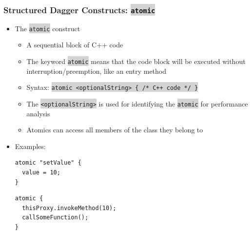 \documentclass{beamer}
\newcommand{\code}[1]{\colorbox{lightgray}{\texttt{#1}}}
\begin{document}
\begin{frame}[fragile]
  \frametitle{Structured Dagger Constructs: \code{atomic}}
  \begin{itemize}
    \item The \code{atomic} construct
      \begin{itemize}
        \item A sequential block of C++ code
        \item The keyword \code{atomic} means that the code block will be
          executed without interruption/preemption, like an entry method
        \item Syntax: \code{atomic <optionalString> \{ /* C++ code */ \}}
        \item The \code{<optionalString>} is used for identifying the
          \code{atomic} for performance analysis
        \item Atomics can access all members of the class they belong to
      \end{itemize}
    \item Examples:
      \begin{lstlisting}
atomic "setValue" {
  value = 10;
}
      \end{lstlisting}
      \begin{lstlisting}
atomic {
  thisProxy.invokeMethod(10);
  callSomeFunction();
}
      \end{lstlisting}
  \end{itemize}
\end{frame}
\end{document}
